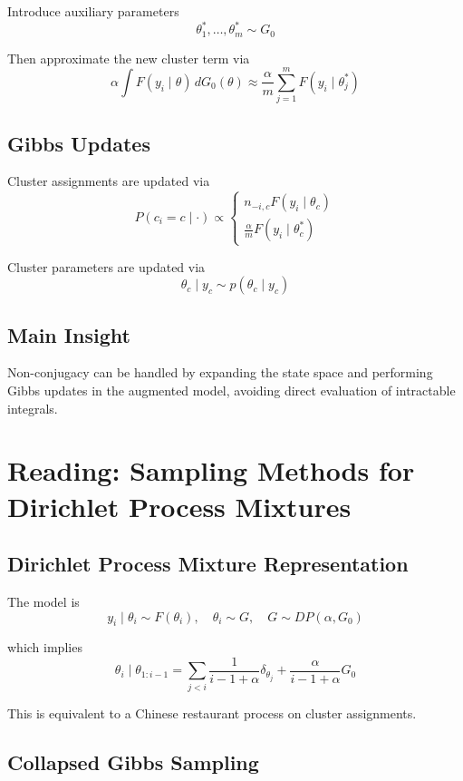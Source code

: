 \documentclass[12pt,oneside]{book}
\numberwithin{equation}{section}
\theoremstyle{definition}
\theoremstyle{plain}
\theoremstyle{remark}
\begin{document}
Introduce auxiliary parameters
\[
\theta_1^*, \dots, \theta_m^* \sim G_0
\]

Then approximate the new cluster term via
\[
\alpha \int F(y_i \mid \theta)\, dG_0(\theta)
\approx
\frac{\alpha}{m} \sum_{j=1}^m F(y_i \mid \theta_j^*)
\]

\subsection*{Gibbs Updates}

Cluster assignments are updated via
\[
P(c_i = c \mid \cdot)
\propto
\begin{cases}
n_{-i,c} F(y_i \mid \theta_c) \\
\frac{\alpha}{m} F(y_i \mid \theta_c^*)
\end{cases}
\]

Cluster parameters are updated via
\[
\theta_c \mid y_c \sim p(\theta_c \mid y_c)
\]

\subsection*{Main Insight}

Non-conjugacy can be handled by expanding the state space and performing Gibbs updates in the augmented model, avoiding direct evaluation of intractable integrals.



\section{Reading: Sampling Methods for Dirichlet Process Mixtures}

\subsection*{Dirichlet Process Mixture Representation}

The model is
\[
y_i \mid \theta_i \sim F(\theta_i), \quad \theta_i \sim G, \quad G \sim DP(\alpha, G_0)
\]

which implies
\[
\theta_i \mid \theta_{1:i-1}
=
\sum_{j<i} \frac{1}{i-1+\alpha}\delta_{\theta_j}
+
\frac{\alpha}{i-1+\alpha} G_0
\]

This is equivalent to a Chinese restaurant process on cluster assignments.

\subsection*{Collapsed Gibbs Sampling}
\end{document}
